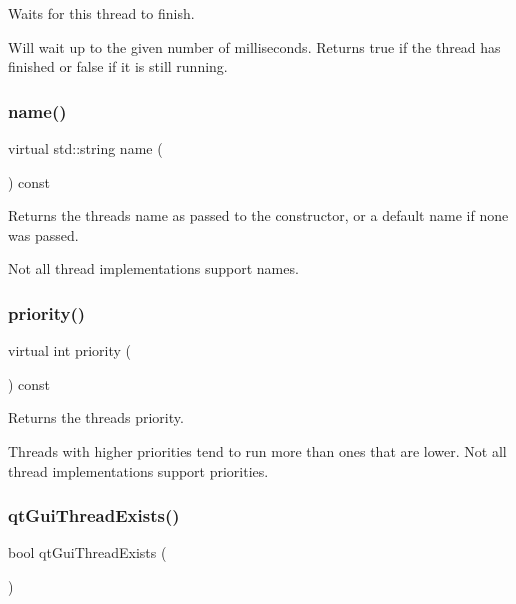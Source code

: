 Waits for this thread to finish. 

Will wait up to the given number of milliseconds. Returns true if the thread has finished or false if it is still running. \mbox{\label{classsgl_1_1GThread_a7f04e718c6856c4d3d77a496b6acad0d}} 
\subsubsection{\texorpdfstring{name()}{name()}}
{\footnotesize\ttfamily virtual std\+::string name (\begin{DoxyParamCaption}{ }\end{DoxyParamCaption}) const\hspace{0.3cm}{\ttfamily [pure virtual]}}



Returns the thread\textquotesingle{}s name as passed to the constructor, or a default name if none was passed. 

Not all thread implementations support names. \mbox{\label{classsgl_1_1GThread_afefd48fe4270e6c5f2ec4c129080bfde}} 
\subsubsection{\texorpdfstring{priority()}{priority()}}
{\footnotesize\ttfamily virtual int priority (\begin{DoxyParamCaption}{ }\end{DoxyParamCaption}) const\hspace{0.3cm}{\ttfamily [pure virtual]}}



Returns the thread\textquotesingle{}s priority. 

Threads with higher priorities tend to run more than ones that are lower. Not all thread implementations support priorities. \mbox{\label{classsgl_1_1GThread_afee663b5d7998135c2aab0585b2ad37f}} 
\subsubsection{\texorpdfstring{qt\+Gui\+Thread\+Exists()}{qtGuiThreadExists()}}
{\footnotesize\ttfamily bool qt\+Gui\+Thread\+Exists (\begin{DoxyParamCaption}{ }\end{DoxyParamCaption})\hspace{0.3cm}{\ttfamily [static]}}



